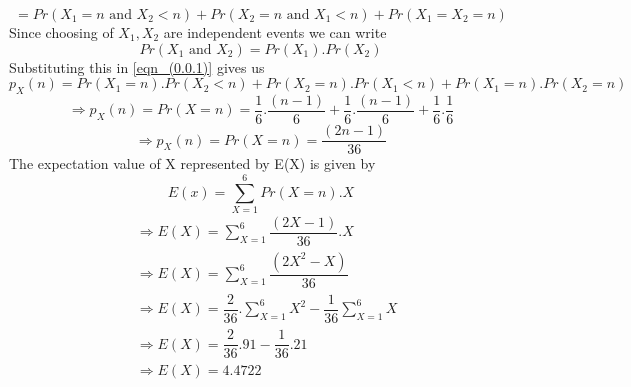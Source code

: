 \documentclass[journal,12pt,twocolumn]{IEEEtran}
\begin{document}
\begin{equation} \label{eqn_(0.0.1)}
    = Pr(X_1=n\text{ and }X_2<n)+Pr(X_2=n\text{ and }X_1<n)+Pr(X_1=X_2=n)
\end{equation}
 Since choosing of $X_1,X_2$ are independent events we can write 
 $$Pr(X_1 \text{ and }X_2)=Pr(X_1).Pr(X_2)$$
 Substituting this in \eqref{eqn_(0.0.1)} gives us
 $$p_X(n)=Pr(X_1=n).Pr(X_2<n)+Pr(X_2=n).Pr(X_1<n)+Pr(X_1=n).Pr(X_2=n)$$
$$\Longrightarrow p_X(n)=Pr(X=n)=\dfrac{1}{6}.\dfrac{(n-1)}{6}+\dfrac{1}{6}.\dfrac{(n-1)}{6}+\dfrac{1}{6}.\dfrac{1}{6}$$
$$\Longrightarrow p_X(n)=Pr(X=n)=\dfrac{(2n-1)}{36}$$
The expectation value of X represented by E(X) is given by
$$E(x)=\sum_{X=1}^{6} Pr(X=n).X$$
\begin{align}
& \Longrightarrow E(X)=\sum_{X=1}^{6} \dfrac{(2X-1)}{36}.X\\
& \Longrightarrow E(X)=\sum_{X=1}^{6} \dfrac{(2X^2-X)}{36}\\
& \Longrightarrow E(X)=\dfrac{2}{36}.\sum_{X=1}^{6} X^2-\dfrac{1}{36}\sum_{X=1}^{6} X\\
& \Longrightarrow E(X)=\dfrac{2}{36}.91-\dfrac{1}{36}.21\\
& \Longrightarrow E(X)= 4.4722
\end{align}
\end{document}
